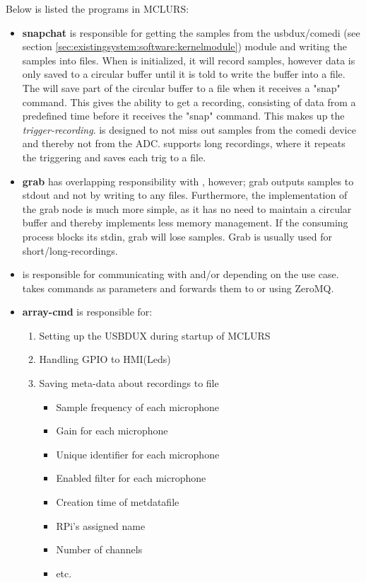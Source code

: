 Below is listed the programs in MCLURS:
\begin{itemize}
	\item \textbf{snapchat} is responsible for getting the samples from the usbdux/comedi (see section \ref{sec:existingsystem:software:kernelmodule}) module and writing the samples into files. When  is initialized, it will record samples, however data is only saved to a circular buffer until it is told to write the buffer into a file. The  will save part of the circular buffer to a file when it receives a "snap" command. This gives the ability to get a recording, consisting of data from a predefined time before it receives the "snap" command. This makes up the \textit{trigger-recording}.  is designed to not miss out samples from the comedi device and thereby not from the ADC.  supports long recordings, where it repeats the triggering and saves each trig to a file.
	
	\item \textbf{grab} has overlapping responsibility with , however; grab outputs samples to stdout and not by writing to any files. Furthermore, the implementation of the grab node is much more simple, as it has no need to maintain a circular buffer and thereby implements less memory management. If the consuming process blocks its stdin, grab will lose samples. Grab is usually used for short/long-recordings.

	\item  {} is responsible for communicating with  and/or  depending on the use case.  takes commands as parameters and forwards them to  or  using ZeroMQ.

	\item \textbf{array-cmd} is responsible for:
	\begin{enumerate}	
		\item Setting up the USBDUX during startup of MCLURS 
		\item Handling GPIO to HMI(Leds)
		\item Saving meta-data about recordings to file
			\begin{itemize}
				\item Sample frequency of each microphone
				\item Gain for each microphone
				\item Unique identifier for each microphone
				\item Enabled filter for each microphone
				\item Creation time of metdatafile
				\item RPi's assigned name
				\item Number of channels
				\item etc.
			\end{itemize}
		

\end{enumerate}
\end{itemize}
